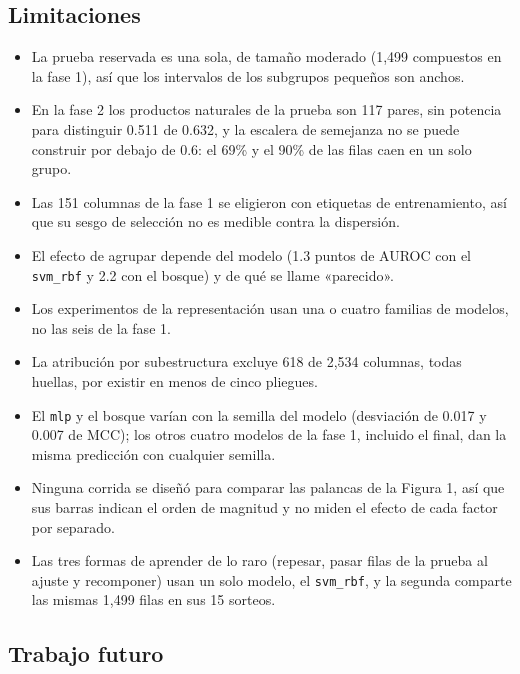 \documentclass[letterpaper,11pt]{article}
\providecommand{\tightlist}{\setlength{\itemsep}{0pt}\setlength{\parskip}{0pt}}
\begin{document}
\subsection{Limitaciones}

\begin{itemize}
\tightlist
\item
  La prueba reservada es una sola, de tamaño moderado (1,499 compuestos en la fase 1), así que los intervalos de los subgrupos pequeños son anchos.
\item
  En la fase 2 los productos naturales de la prueba son 117 pares, sin potencia para distinguir 0.511 de 0.632, y la escalera de semejanza no se puede construir por debajo de 0.6: el 69\% y el 90\% de las filas caen en un solo grupo.
\item
  Las 151 columnas de la fase 1 se eligieron con etiquetas de entrenamiento, así que su sesgo de selección no es medible contra la dispersión.
\item
  El efecto de agrupar depende del modelo (1.3 puntos de AUROC con el \texttt{svm\_rbf} y 2.2 con el bosque) y de qué se llame «parecido».
\item
  Los experimentos de la representación usan una o cuatro familias de modelos, no las seis de la fase 1.
\item
  La atribución por subestructura excluye 618 de 2,534 columnas, todas huellas, por existir en menos de cinco pliegues.
\item
  El \texttt{mlp} y el bosque varían con la semilla del modelo (desviación de 0.017 y 0.007 de MCC); los otros cuatro modelos de la fase 1, incluido el final, dan la misma predicción con cualquier semilla.
\item
  Ninguna corrida se diseñó para comparar las palancas de la Figura 1, así que sus barras indican el orden de magnitud y no miden el efecto de cada factor por separado.
\item
  Las tres formas de aprender de lo raro (repesar, pasar filas de la prueba al ajuste y recomponer) usan un solo modelo, el \texttt{svm\_rbf}, y la segunda comparte las mismas 1,499 filas en sus 15 sorteos.
\end{itemize}

\subsection{Trabajo futuro}
\end{document}
